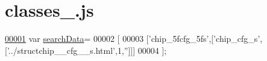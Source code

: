 \hypertarget{classes__1_8js_source}{}\section{classes\+\_.\+js}
\label{classes__1_8js_source}

\begin{DoxyCode}
\hypertarget{classes__1_8js_source.tex_l00001}{}\hyperlink{classes__1_8js_ad01a7523f103d6242ef9b0451861231e}{00001} var \hyperlink{classes__1_8js_ad01a7523f103d6242ef9b0451861231e}{searchData}=
00002 [
00003   [\textcolor{stringliteral}{'chip\_5fcfg\_5fs'},[\textcolor{stringliteral}{'chip\_cfg\_s'},[\textcolor{stringliteral}{'../structchip\_\_cfg\_\_s.html'},1,\textcolor{stringliteral}{''}]]]
00004 ];
\end{DoxyCode}
